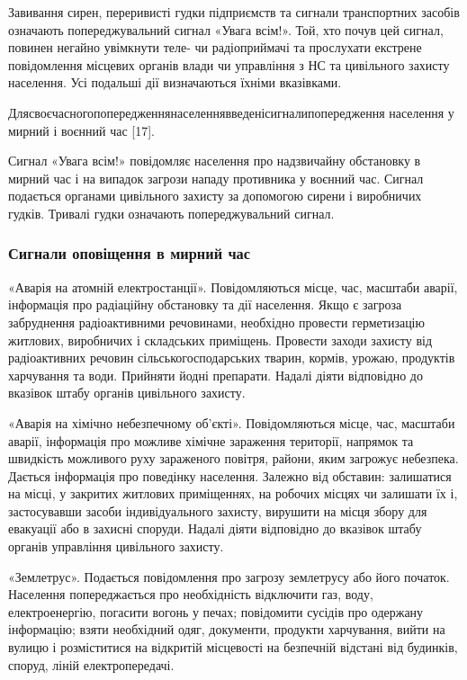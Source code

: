 Завивання сирен, переривисті гудки підприємств та сигнали транспортних засобів означають попереджувальний сигнал «Увага всім!». Той, хто почув цей сигнал, повинен негайно увімкнути теле- чи радіоприймачі та прослухати екстрене повідомлення місцевих органів влади чи управління з НС та цивільного захисту населення. Усі подальші дії визначаються їхніми вказівками.

Для\hfill своєчасного\hfill попередження\hfill населення\hfill введені\hfill сигнали\newline попередження населення у мирний і воєнний час [17].

Сигнал «Увага всім!» повідомляє населення про надзвичайну обстановку в мирний час і на випадок загрози нападу противника у воєнний час. Сигнал подається органами цивільного захисту за допомогою сирени і виробничих гудків. Тривалі гудки означають попереджувальний сигнал.

\subsubsection{Сигнали оповіщення в мирний час}

«Аварія на атомній електростанції». Повідомляються місце, час, масштаби аварії, інформація про радіаційну обстановку та дії населення. Якщо є загроза забруднення радіоактивними речовинами, необхідно провести герметизацію житлових, виробничих і складських приміщень. Провести заходи захисту від радіоактивних речовин сільськогосподарських тварин, кормів, урожаю, продуктів харчування та води. Прийняти йодні препарати. Надалі діяти відповідно до вказівок штабу органів цивільного захисту.

«Аварія на хімічно небезпечному об'єкті». Повідомляються місце, час, масштаби аварії, інформація про можливе хімічне зараження території, напрямок та швидкість можливого руху зараженого повітря, райони, яким загрожує небезпека. Дається інформація про поведінку населення. Залежно від обставин: залишатися на місці, у закритих житлових приміщеннях, на робочих місцях чи залишати їх і, застосувавши засоби індивідуального захисту, вирушити на місця збору для евакуації або в захисні споруди. Надалі діяти відповідно до вказівок штабу органів управління цивільного захисту.

«Землетрус». Подається повідомлення про загрозу землетрусу або його початок. Населення попереджається про необхідність відключити газ, воду, електроенергію, погасити вогонь у печах; повідомити сусідів про одержану інформацію; взяти необхідний одяг, документи, продукти харчування, вийти на вулицю і розміститися на відкритій місцевості на безпечній відстані від будинків, споруд, ліній електропередачі.

